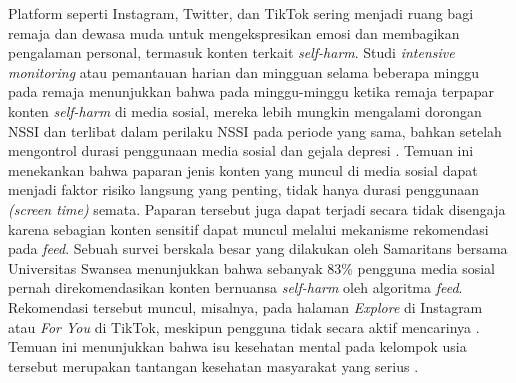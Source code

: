 Platform seperti Instagram, Twitter, dan TikTok sering menjadi ruang bagi remaja dan dewasa muda untuk mengekspresikan emosi dan membagikan pengalaman personal, termasuk konten terkait \emph{self-harm}. Studi \textit{intensive monitoring} atau pemantauan harian dan mingguan selama beberapa minggu pada remaja menunjukkan bahwa pada minggu-minggu ketika remaja terpapar konten \textit{self-harm} di media sosial, mereka lebih mungkin mengalami dorongan NSSI dan terlibat dalam perilaku NSSI pada periode yang sama, bahkan setelah mengontrol durasi penggunaan media sosial dan gejala depresi \cite{zhang2025social}. Temuan ini menekankan bahwa paparan jenis konten yang muncul di media sosial dapat menjadi faktor risiko langsung yang penting, tidak hanya durasi penggunaan \textit{(screen time)} semata. Paparan tersebut juga dapat terjadi secara tidak disengaja karena sebagian konten sensitif dapat muncul melalui mekanisme rekomendasi pada \textit{feed}. Sebuah survei berskala besar yang dilakukan oleh Samaritans bersama Universitas Swansea menunjukkan bahwa sebanyak 83\% pengguna media sosial pernah direkomendasikan konten bernuansa \emph{self-harm} oleh algoritma \emph{feed}. Rekomendasi tersebut muncul, misalnya, pada halaman \emph{Explore} di Instagram atau \emph{For You} di TikTok, meskipun pengguna tidak secara aktif mencarinya \cite{samaritans2022social}. Temuan ini menunjukkan bahwa isu kesehatan mental pada kelompok usia tersebut merupakan tantangan kesehatan masyarakat yang serius \cite{WHO2025AdolescentMentalHealth}.



